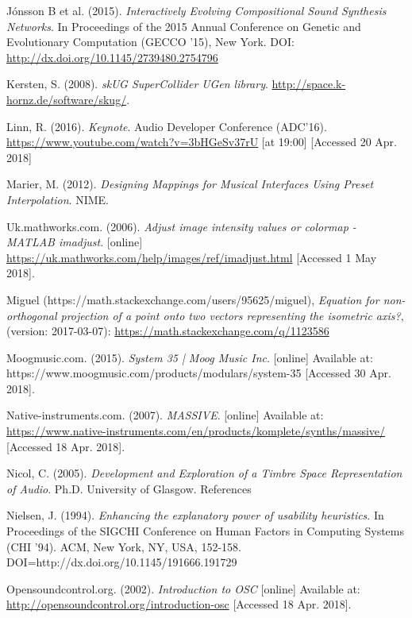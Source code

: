 \documentclass[11pt, oneside]{report}   	%
\begin{document}
{\begin{thebibliography}{9}
J\'{o}nsson B et al. (2015). \emph{Interactively Evolving Compositional Sound Synthesis Networks}. In Proceedings of the 2015 Annual Conference on Genetic and Evolutionary Computation (GECCO '15), New York. DOI: \url{http://dx.doi.org/10.1145/2739480.2754796}

Kersten, S. (2008). \emph{skUG SuperCollider UGen library}. \url{http://space.k- hornz.de/software/skug/}.

Linn, R. (2016). \emph{Keynote}.  Audio Developer Conference (ADC'16). \url{https://www.youtube.com/watch?v=3bHGeSv37rU} [at 19:00] [Accessed 20 Apr. 2018]

Marier, M. (2012). \emph{Designing Mappings for Musical Interfaces Using Preset Interpolation}. NIME.

Uk.mathworks.com. (2006). \emph{Adjust image intensity values or colormap - MATLAB imadjust}. [online] \url{https://uk.mathworks.com/help/images/ref/imadjust.html} [Accessed 1 May 2018].

Miguel (https://math.stackexchange.com/users/95625/miguel), \emph{Equation for non-orthogonal projection of a point onto two vectors representing the isometric axis?}, (version: 2017-03-07): \url{https://math.stackexchange.com/q/1123586}

Moogmusic.com. (2015). \emph{System 35 | Moog Music Inc}. [online] Available at: https://www.moogmusic.com/products/modulars/system-35 [Accessed 30 Apr. 2018].

Native-instruments.com. (2007). \emph{MASSIVE}. [online] Available at: \url{https://www.native-instruments.com/en/products/komplete/synths/massive/} [Accessed 18 Apr. 2018].

Nicol, C. (2005). \emph{Development and Exploration of a Timbre Space Representation of Audio}. Ph.D. University of Glasgow.
References

Nielsen, J. (1994). \emph{Enhancing the explanatory power of usability heuristics}. In Proceedings of the SIGCHI Conference on Human Factors in Computing Systems (CHI '94). ACM, New York, NY, USA, 152-158. DOI=http://dx.doi.org/10.1145/191666.191729

Opensoundcontrol.org. (2002). \emph{Introduction to OSC} [online] Available at: \url{http://opensoundcontrol.org/introduction-osc} [Accessed 18 Apr. 2018].


\end{thebibliography}}
\end{document}
